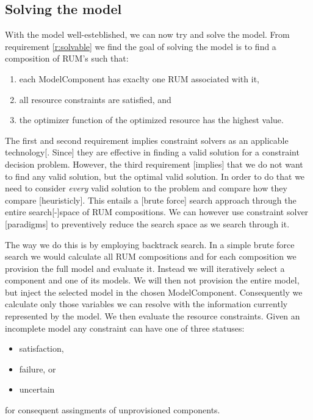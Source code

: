 \subsection{Solving the model}
With the model well-esteblished, we can now try and solve the model. From requirement \ref{r:solvable} we find the goal of solving the model is to find a composition of RUM's such that:
\begin{enumerate}
\item each ModelComponent has exaclty one RUM associated with it,
\item all resource constraints are satisfied, and
\item the optimizer function of the optimized resource has the highest value.
\end{enumerate}
The first and second requirement implies constraint solvers as an applicable technology[. Since] they are effective in finding a valid solution for a constraint decision problem. However, the third requirement [implies] that we do not want to find any valid solution, but the optimal valid solution. In order to do that we need to consider \emph{every} valid solution to the problem and compare how they compare [heuristicly]. This entails a [brute force] search approach through the entire search[-]space of RUM compositions. We can however use constraint solver [paradigms] to preventively reduce the search space as we search through it.

The way we do this is by employing backtrack search. In a simple brute force search we would calculate all RUM compositions and for each composition we provision the full model and evaluate it. Instead we will iteratively select a component and one of its models. We will then not provision the entire model, but inject the selected model in the chosen ModelComponent. Consequently we calculate only those variables we can resolve with the information currently represented by the model. We then evaluate the resource constraints. Given an incomplete model any constraint can have one of three statuses:
\begin{itemize}
\item satisfaction,
\item failure, or
\item uncertain
\end{itemize}
for consequent assingments of unprovisioned components.

